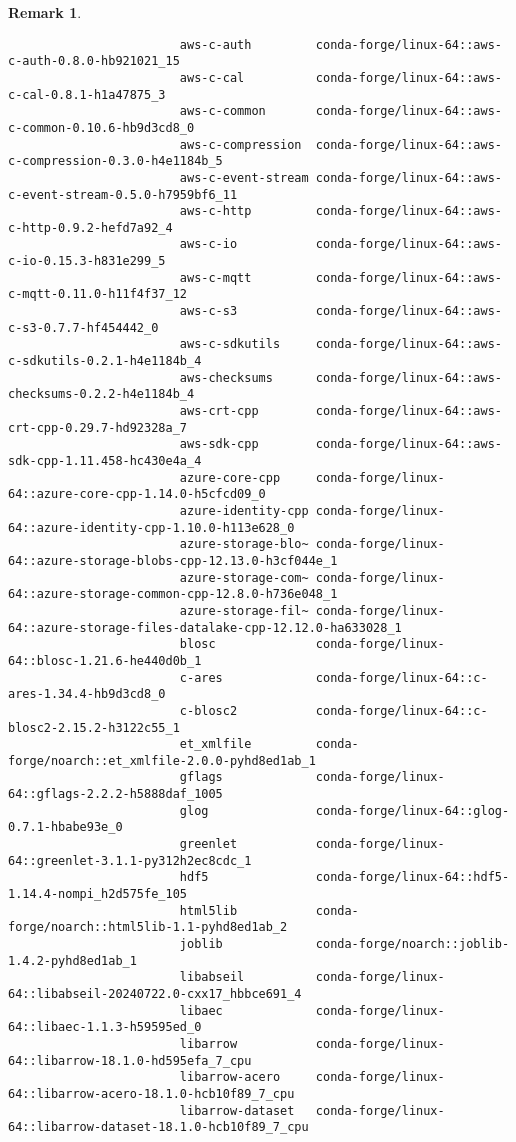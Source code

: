 \documentclass{article}
\newtheorem{remark}{Remark}
\begin{document}
\begin{enumerate}
\begin{itemize}
\begin{itemize}
\begin{itemize}
\begin{remark}
\begin{verbatim}
						aws-c-auth         conda-forge/linux-64::aws-c-auth-0.8.0-hb921021_15 
						aws-c-cal          conda-forge/linux-64::aws-c-cal-0.8.1-h1a47875_3 
						aws-c-common       conda-forge/linux-64::aws-c-common-0.10.6-hb9d3cd8_0 
						aws-c-compression  conda-forge/linux-64::aws-c-compression-0.3.0-h4e1184b_5 
						aws-c-event-stream conda-forge/linux-64::aws-c-event-stream-0.5.0-h7959bf6_11 
						aws-c-http         conda-forge/linux-64::aws-c-http-0.9.2-hefd7a92_4 
						aws-c-io           conda-forge/linux-64::aws-c-io-0.15.3-h831e299_5 
						aws-c-mqtt         conda-forge/linux-64::aws-c-mqtt-0.11.0-h11f4f37_12 
						aws-c-s3           conda-forge/linux-64::aws-c-s3-0.7.7-hf454442_0 
						aws-c-sdkutils     conda-forge/linux-64::aws-c-sdkutils-0.2.1-h4e1184b_4 
						aws-checksums      conda-forge/linux-64::aws-checksums-0.2.2-h4e1184b_4 
						aws-crt-cpp        conda-forge/linux-64::aws-crt-cpp-0.29.7-hd92328a_7 
						aws-sdk-cpp        conda-forge/linux-64::aws-sdk-cpp-1.11.458-hc430e4a_4 
						azure-core-cpp     conda-forge/linux-64::azure-core-cpp-1.14.0-h5cfcd09_0 
						azure-identity-cpp conda-forge/linux-64::azure-identity-cpp-1.10.0-h113e628_0 
						azure-storage-blo~ conda-forge/linux-64::azure-storage-blobs-cpp-12.13.0-h3cf044e_1 
						azure-storage-com~ conda-forge/linux-64::azure-storage-common-cpp-12.8.0-h736e048_1 
						azure-storage-fil~ conda-forge/linux-64::azure-storage-files-datalake-cpp-12.12.0-ha633028_1 
						blosc              conda-forge/linux-64::blosc-1.21.6-he440d0b_1 
						c-ares             conda-forge/linux-64::c-ares-1.34.4-hb9d3cd8_0 
						c-blosc2           conda-forge/linux-64::c-blosc2-2.15.2-h3122c55_1 
						et_xmlfile         conda-forge/noarch::et_xmlfile-2.0.0-pyhd8ed1ab_1 
						gflags             conda-forge/linux-64::gflags-2.2.2-h5888daf_1005 
						glog               conda-forge/linux-64::glog-0.7.1-hbabe93e_0 
						greenlet           conda-forge/linux-64::greenlet-3.1.1-py312h2ec8cdc_1 
						hdf5               conda-forge/linux-64::hdf5-1.14.4-nompi_h2d575fe_105 
						html5lib           conda-forge/noarch::html5lib-1.1-pyhd8ed1ab_2 
						joblib             conda-forge/noarch::joblib-1.4.2-pyhd8ed1ab_1 
						libabseil          conda-forge/linux-64::libabseil-20240722.0-cxx17_hbbce691_4 
						libaec             conda-forge/linux-64::libaec-1.1.3-h59595ed_0 
						libarrow           conda-forge/linux-64::libarrow-18.1.0-hd595efa_7_cpu 
						libarrow-acero     conda-forge/linux-64::libarrow-acero-18.1.0-hcb10f89_7_cpu 
						libarrow-dataset   conda-forge/linux-64::libarrow-dataset-18.1.0-hcb10f89_7_cpu 

\end{verbatim}
\end{remark}
\end{itemize}
\end{itemize}
\end{itemize}
\end{enumerate}
\end{document}

